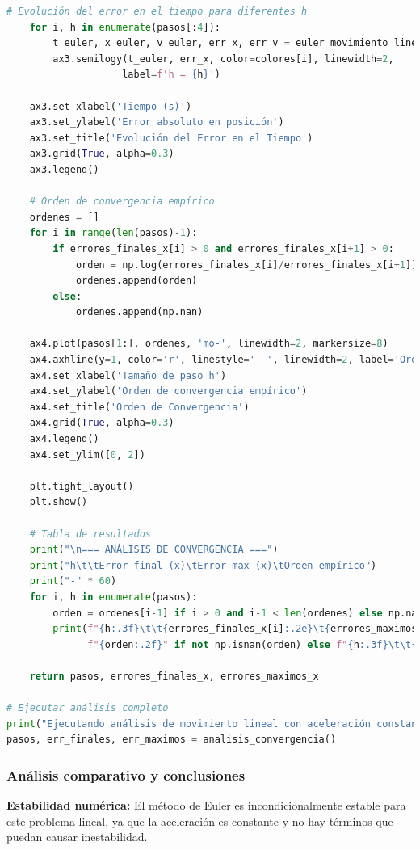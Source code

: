 \documentclass{article}
\begin{document}
\begin{lstlisting}[language=Python, caption={Implementación detallada del método de Euler}]
    # Evolución del error en el tiempo para diferentes h
    for i, h in enumerate(pasos[:4]):
        t_euler, x_euler, v_euler, err_x, err_v = euler_movimiento_lineal(t_final, h)
        ax3.semilogy(t_euler, err_x, color=colores[i], linewidth=2, 
                    label=f'h = {h}')
    
    ax3.set_xlabel('Tiempo (s)')
    ax3.set_ylabel('Error absoluto en posición')
    ax3.set_title('Evolución del Error en el Tiempo')
    ax3.grid(True, alpha=0.3)
    ax3.legend()
    
    # Orden de convergencia empírico
    ordenes = []
    for i in range(len(pasos)-1):
        if errores_finales_x[i] > 0 and errores_finales_x[i+1] > 0:
            orden = np.log(errores_finales_x[i]/errores_finales_x[i+1]) / np.log(pasos[i]/pasos[i+1])
            ordenes.append(orden)
        else:
            ordenes.append(np.nan)
    
    ax4.plot(pasos[1:], ordenes, 'mo-', linewidth=2, markersize=8)
    ax4.axhline(y=1, color='r', linestyle='--', linewidth=2, label='Orden teórico = 1')
    ax4.set_xlabel('Tamaño de paso h')
    ax4.set_ylabel('Orden de convergencia empírico')
    ax4.set_title('Orden de Convergencia')
    ax4.grid(True, alpha=0.3)
    ax4.legend()
    ax4.set_ylim([0, 2])
    
    plt.tight_layout()
    plt.show()
    
    # Tabla de resultados
    print("\n=== ANÁLISIS DE CONVERGENCIA ===")
    print("h\t\tError final (x)\tError max (x)\tOrden empírico")
    print("-" * 60)
    for i, h in enumerate(pasos):
        orden = ordenes[i-1] if i > 0 and i-1 < len(ordenes) else np.nan
        print(f"{h:.3f}\t\t{errores_finales_x[i]:.2e}\t{errores_maximos_x[i]:.2e}\t"
              f"{orden:.2f}" if not np.isnan(orden) else f"{h:.3f}\t\t{errores_finales_x[i]:.2e}\t{errores_maximos_x[i]:.2e}\t---")
    
    return pasos, errores_finales_x, errores_maximos_x

# Ejecutar análisis completo
print("Ejecutando análisis de movimiento lineal con aceleración constante...")
pasos, err_finales, err_maximos = analisis_convergencia()
	\end{lstlisting}

	\subsubsection{Análisis comparativo y conclusiones}
	
	\textbf{Estabilidad numérica:}
	El método de Euler es incondicionalmente estable para este problema lineal, ya que la aceleración es constante y no hay términos que puedan causar inestabilidad.
	
\end{document}
